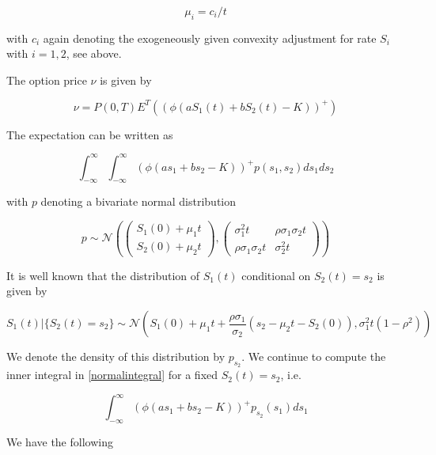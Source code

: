 \documentclass{amsart}
\theoremstyle{plain}
\numberwithin{equation}{section}
\begin{document}
\begin{equation}
\mu_i = c_i / t
\end{equation}

with $c_i$ again denoting the exogeneously given convexity adjustment for rate $S_i$ with $i=1,2$, see above.

The option price $\nu$ is given by

\begin{equation}
\nu = P(0,T) E^T \left( (\phi(aS_1(t) + bS_2(t) - K))^+ \right)
\end{equation}

The expectation can be written as

\begin{equation}\label{normalintegral}
\int_{-\infty}^{\infty} \int_{-\infty}^{\infty} (\phi(as_1+bs_2-K))^+ p(s_1,s_2) ds_1 ds_2
\end{equation}

with $p$ denoting a bivariate normal distribution

\begin{equation}
p \sim \mathcal{N}\left( \begin{pmatrix} S_1(0) + \mu_1t \\ S_2(0) + \mu_2t \end{pmatrix}, 
\begin{pmatrix} \sigma_1^2t & \rho\sigma_1\sigma_2t \\ \rho\sigma_1\sigma_2t & \sigma_2^2t \end{pmatrix} \right)
\end{equation}

It is well known that the distribution of $S_1(t)$ conditional on $S_2(t) = s_2$ is given by

\begin{equation}
S_1(t) | \{ S_2(t) = s_2 \} \sim \mathcal{N}\left( S_1(0) + \mu_1t + \frac{\rho\sigma_1}{\sigma_2}(s_2-\mu_2t-S_2(0)) , \sigma_1^2t (1-\rho^2)\right)
\end{equation}

We denote the density of this distribution by $p_{s_2}$. We continue to compute the inner integral in \ref{normalintegral} for a fixed $S_2(t) = s_2$, i.e.

\begin{equation}\label{innerintegral}
\int_{-\infty}^{\infty} (\phi(as_1+bs_2-K))^+ p_{s_2}(s_1) ds_1
\end{equation}

We have the following
\end{document}
